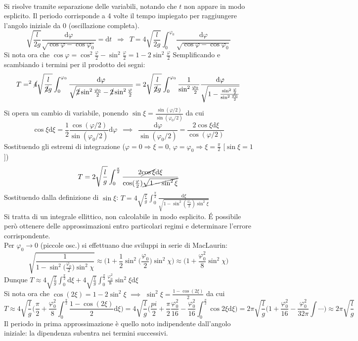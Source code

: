 \documentclass[10pt]{article}
\theoremstyle{plain}
\begin{document}
\\Si risolve tramite separazione delle variabili, notando che $t$ non appare in modo esplicito. Il periodo corrisponde a 4 volte il tempo impiegato per raggiungere l'angolo iniziale da $0$ (oscillazione completa).
\[\sqrt{\frac{l}{2g}}\frac{\textrm{d}\varphi}{\sqrt{\cos \varphi - \cos \varphi_0}} = \textrm{d}t \enspace \Rightarrow \enspace T = 4\sqrt{\frac{l}{2g}} \int_0^{\varphi_0}\frac{\textrm{d}\varphi}{\sqrt{\cos \varphi - \cos \varphi_0}}\]
Si nota ora che $\displaystyle \cos \varphi = \cos^2 \frac{\varphi}{2} - \sin^2 \frac{\varphi}{2} = 1 - 2 \sin^2 \frac{\varphi}{2}$
Semplificando e scambiando i termini per il prodotto dei segni:
\[T = ^2\cancel{4}\sqrt{\frac{l}{\cancel{2}g}} \int_0^{\varphi_0}\frac{\textrm{d}\varphi}{\sqrt{\cancel{2} \sin^2 \frac{\varphi_0}{2} - \cancel{2} \sin^2 \frac{\varphi}{2}}} = 2 \sqrt{\frac{l}{\cancel{2}g}} \int_0^{\varphi_0}\frac{1}{\sin^2 \frac{\varphi_0}{2}}\frac{\textrm{d}\varphi}{\sqrt{1 - \frac{\sin^2 \frac{\varphi}{2}}{\sin^2 \frac{\varphi_0}{2}}}}\]
Si opera un cambio di variabile, ponendo $\displaystyle \sin \xi = \frac{\sin(\varphi/2)}{\sin(\varphi_0/2)}$ da cui
\[\cos \xi \textrm{d}\xi = \frac{1}{2} \frac{\cos(\varphi/2)}{\sin(\varphi_0/2)}\textrm{d}\varphi \enspace \implies \enspace \frac{\textrm{d}\varphi}{\sin(\varphi_0/2)} = \frac{2 \cos \xi \textrm{d}\xi}{\cos(\varphi/2)}\]
Sostituendo gli estremi di integrazione ($\varphi = 0 \Rightarrow \xi = 0$, $\varphi = \varphi_0 \Rightarrow \xi = \frac{\pi}{2}$ [$\sin \xi = 1$])
\[T = 2 \sqrt{\frac{l}{g}} \int_0^{\frac{\pi}{2}}\frac{2 \cancel{\cos \xi}\textrm{d}\xi}{\cos (\frac{\varphi}{2})\cancel{\sqrt{1 - \sin^2 \xi}}}\]
Sostituendo dalla definizione di $\sin \xi$: $\displaystyle T = 4 \sqrt{\frac{l}{g}} \int_0^{\frac{\pi}{2}} \frac{\textrm{d}\xi}{\sqrt{1 - \sin^2(\frac{\varphi_0}{2}) \sin^2 \xi}}$
\\Si tratta di un integrale ellittico, non calcolabile in modo esplicito. \'E possibile però ottenere delle approssimazioni entro particolari regimi e determinare l'errore corrispondente.
\\Per $\varphi_0 \rightarrow 0$ (piccole osc.) si effettuano due sviluppi in serie di MacLaurin:
\[\sqrt{\frac{1}{1 - \sin^2\big(\frac{\varphi_0}{2}\big)\sin^2\chi}} \approx \bigg(1 + \frac{1}{2} \sin^2\big(\frac{\varphi_0}{2}\big)\sin^2\chi) \approx \bigg( 1 + \frac{\varphi_0^2}{8}\sin^2\chi\bigg)\]
Dunque $\displaystyle T \approx 4 \sqrt{\frac{l}{g}}\int_0^{\frac{\pi}{2}}\textrm{d}\xi + 4 \sqrt{\frac{l}{g}} \int_0^{\frac{\pi}{2}} \frac{\varphi_0^2}{8} \sin^2\xi\textrm{d}\xi$
\\Si nota ora che $\cos(2\xi) = 1 - 2\sin^2 \xi$ $\implies$ $\displaystyle \sin^2 \xi = \frac{1 - \cos(2\xi)}{2}$ da cui
\[T \approx 4 \sqrt{\frac{l}{g}}\bigg(\frac{\pi}{2} + \frac{\varphi_0^2}{8} \int_0^{\frac{\pi}{2}}\frac{1 - \cos(2\xi)}{2}\textrm{d}\xi\bigg) = 4 \sqrt{\frac{l}{g}} \bigg(\frac{pi}{2} + \frac{\pi}{2}\frac{\varphi_0^2}{16} - \frac{\varphi_0^2}{16}\int_0^{\frac{\pi}{2}}\cos 2 \xi \textrm{d}\xi\bigg) = 2 \pi \sqrt{\frac{l}{g}}\big(1 + \frac{\varphi_0^2}{16} - \frac{\varphi_0^2}{32\pi}\int \cdots\big) \approx 2\pi\sqrt{\frac{l}{g}}\]
Il periodo in prima approssimazione è quello noto indipendente dall'angolo iniziale: la dipendenza subentra nei termini successivi.
\end{document}
